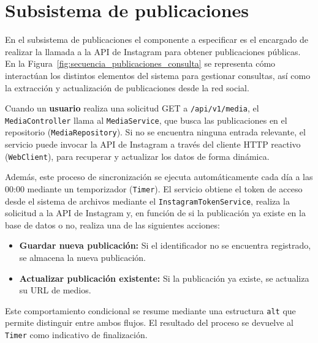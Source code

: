 \section{Subsistema de publicaciones}

En el subsistema de publicaciones el componente a especificar es el encargado de realizar la llamada a la \gls{API} de Instagram para obtener publicaciones públicas. En la Figura~\ref{fig:secuencia_publicaciones_consulta} se representa cómo interactúan los distintos elementos del sistema para gestionar consultas, así como la extracción y actualización de publicaciones desde la red social.

Cuando un \textbf{usuario} realiza una solicitud GET a \texttt{/api/v1/media}, el \texttt{MediaController} llama al \texttt{MediaService}, que busca las publicaciones en el repositorio (\texttt{MediaRepository}). Si no se encuentra ninguna entrada relevante, el servicio puede invocar la \gls{API} de Instagram a través del cliente HTTP reactivo (\texttt{WebClient}), para recuperar y actualizar los datos de forma dinámica.

Además, este proceso de sincronización se ejecuta automáticamente cada día a las 00:00 mediante un temporizador (\texttt{Timer}). El servicio obtiene el token de acceso desde el sistema de archivos mediante el \texttt{InstagramTokenService}, realiza la solicitud a la \gls{API} de Instagram y, en función de si la publicación ya existe en la base de datos o no, realiza una de las siguientes acciones:

\begin{itemize}
    \item \textbf{Guardar nueva publicación:} Si el identificador no se encuentra registrado, se almacena la nueva publicación.
    \item \textbf{Actualizar publicación existente:} Si la publicación ya existe, se actualiza su URL de medios.
\end{itemize}

Este comportamiento condicional se resume mediante una estructura \texttt{alt} que permite distinguir entre ambos flujos. El resultado del proceso se devuelve al \texttt{Timer} como indicativo de finalización.

